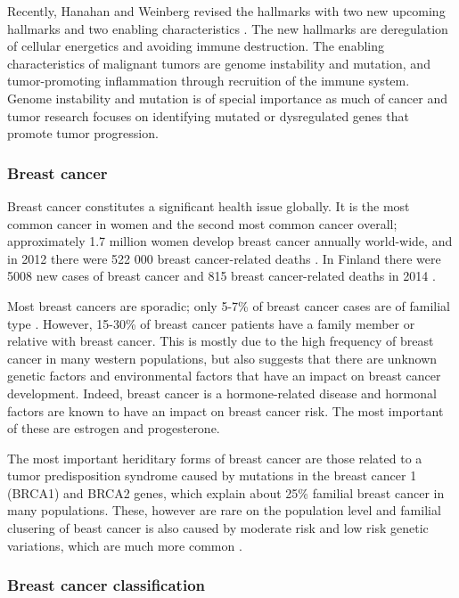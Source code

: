 Recently, Hanahan and Weinberg revised the hallmarks with two new upcoming
hallmarks and two enabling characteristics \citep{Hanahan2011}. The new
hallmarks are deregulation of cellular energetics and avoiding immune
destruction. The enabling characteristics of malignant tumors are genome
instability and mutation, and tumor-promoting inflammation through recruition
of the immune system. Genome instability and mutation is of special importance
as much of cancer and tumor research focuses on identifying mutated or
dysregulated genes that promote tumor progression.



\subsubsection{Breast cancer}\label{breast-cancer}

Breast cancer constitutes a significant health issue globally. It is the most
common cancer in women and the second most common cancer overall;
approximately 1.7 million women develop breast cancer annually world-wide, and
in 2012 there were 522 000 breast cancer-related deaths
\citep{Ferlay2015}. In Finland there were 5008 new cases of breast cancer
 and 815 breast cancer-related deaths in 2014 \citep{Syoparekisteri}.

Most breast cancers are sporadic; only 5-7\% of breast cancer cases are of
familial type \citep{Melchor2013}. However, 15-30\% of breast cancer patients
have a family member or relative with breast cancer. This is
mostly due to the high frequency of breast cancer in many western populations,
but also suggests that there are unknown genetic factors and environmental
factors that have an impact on breast cancer development. Indeed, breast
cancer is a hormone-related disease and hormonal factors are known to have an
impact on breast cancer risk. The most important of these are
estrogen and progesterone.

The most important heriditary forms of breast cancer are those related to a
tumor predisposition syndrome caused by mutations in the breast cancer 1
(BRCA1) and BRCA2 genes, which explain about 25\% familial breast cancer in
many populations. These, however are rare on the population level and familial
clusering of beast cancer is also caused by moderate risk and low risk genetic
variations, which are much more common \citep{Melchor2013}.


\subsubsection{Breast cancer classification}\label{breast-cancer-classification}


